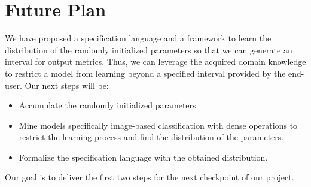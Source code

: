 \section{Future Plan}
\label{sec:future}
We have proposed a specification language and a framework to learn the distribution of the randomly initialized parameters so that we can generate an interval for output metrics. Thus, we can leverage the acquired domain knowledge to restrict a model from learning beyond a specified interval provided by the end-user. Our next steps will be:
\begin{itemize}
	\item Accumulate the randomly initialized parameters.
	\item Mine models specifically image-based classification with dense operations to restrict the learning process and find the distribution of the parameters.
	\item Formalize the specification language with the obtained distribution.
\end{itemize}
Our goal is to deliver the first two steps for the next checkpoint of our project.